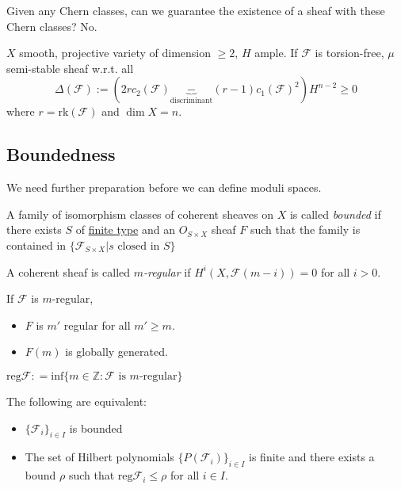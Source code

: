 Given any Chern classes, can we guarantee the existence of a sheaf with these
Chern classes? No.

\begin{theorem}
\label{theorem-Bogomolov}
$X$ smooth, projective variety of dimension $\geq 2$, $H$ ample. If
$\mathcal{F}$ is torsion-free, $\mu$ semi-stable sheaf w.r.t. all
$$
\Delta(\mathcal{F}):=(2rc_2(\mathcal{F})\underbrace{-}_{\text{discriminant}}
(r-1)c_1(\mathcal{F})^2)H^{n-2}\geq 0
$$
where $r=\text{rk}(\mathcal{F})$ and $\dim X=n$.
\end{theorem}

\subsection*{Boundedness}
\label{subsection-boundedness}

We need further preparation before we can define moduli spaces.

\begin{definition}
\label{definition-bounded-family}
A family of isomorphism classes of coherent sheaves on $X$ is called {\it
bounded} if there exists $S$ of \underline{finite type} and an $O_{S \times X}$
sheaf $F$ such that the family is contained in $\{ \mathcal{F}_{S \times X}|s
\text{ closed in }S\}$
\end{definition}

\begin{definition}
\label{definition-m-regularity}
A coherent sheaf is called {\it $m$-regular} if $H^{i}(X,\mathcal{F}(m-i))=0$
for all $i>0$.
\end{definition}

\begin{proposition}
\label{proposition-m-regularity}
If $\mathcal{F}$ is $m$-regular,
\begin{itemize}
\item $F$ is $m'$ regular for all $m' \geq m$.
\item $F(m)$ is globally generated.
\end{itemize}
\end{proposition}

\begin{definition}
\label{definition-regular-infimum}
$\text{reg}\mathcal{F}:
=\text{inf}\{m \in \mathbb{Z}:\mathcal{F}\text{ is $m$-regular}\}$
\end{definition}

\begin{lemma}
\label{lemma-}
The following are equivalent:
\begin{itemize}
\item $\{\mathcal{F}_i\}_{i \in I}$ is bounded
\item The set of Hilbert polynomials $\{P(\mathcal{F}_i)\}_{i \in I}$ is finite
and there exists a bound $\rho$ such that $\text{reg}\mathcal{F}_i\leq \rho$ for
all $i \in I$.
\end{itemize}
\end{lemma}

